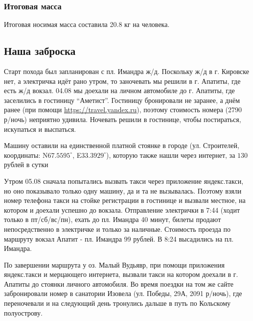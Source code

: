 \subsubsection{Итоговая масса}
Итоговая носимая масса составила 20.8 кг на человека.

\subsection{Наша заброска}
Старт похода был запланирован с пл. Имандра ж/д. Поскольку ж/д в г. Кировске нет, а электричка идёт рано утром,
то заночевать мы решили в г. Апатиты, где есть ж/д вокзал. 04.08 мы доехали на личном автомобиле до г. Апатиты,
где заселились в гостиницу ``Аметист''. Гостиницу бронировали не заранее, а днём ранее
(при помощи \url{https://travel.yandex.ru}), поэтому стоимость номера (2790 р/ночь) неприятно удивила.
Ночевать решили в гостинице, чтобы постираться, искупаться и выспаться.

Машину оставили на единственной платной стоянке в городе (ул. Строителей, координаты:
N$67.5595^{\circ}$, E$33.3929^{\circ}$),
которую также нашли через интернет, за $130$ рублей в сутки

Утром 05.08 сначала попытались вызвать такси через приложение яндекс.такси, но оно показывало только одну машину,
да и та не вызывалась. Поэтому взяли номер телефона такси на стойке регистрации в гостинице и вызвали местное,
на котором и доехали успешно до вокзала. Отправление электрички в 7:44 (ходит только в пт/сб/вс/пн),
ехать до пл. Имандра 40 минут, билеты продают непосредственно в электричке и только за наличные.
Стоимость проезда по маршруту вокзал Апатит - пл. Имандра 99 рублей. В 8:24 высадились на пл. Имандра.

По завершении маршрута у оз. Малый Вудьявр, при помощи приложения яндекс.такси и мерцающего интернета,
вызвали такси на котором доехали в г. Апатиты до стоянки личного автомобиля.
Во время поездки на том же сайте забронировали номер в санатории Изовела (ул. Победы, 29А, 2091 р/ночь),
где переночевали и на следующий день тронулись дальше в путь по Кольскому полуострову.
